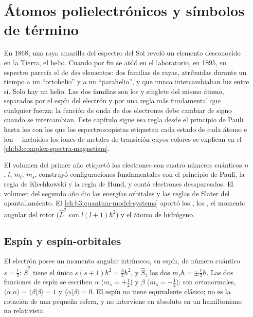 \chapter{Átomos polielectrónicos y símbolos de término}\label{ch:b3:many-electron-atoms}

En 1868, una raya amarilla del espectro del Sol reveló un elemento
desconocido en la Tierra, el helio. Cuando por fin se aisló en el laboratorio, en
1895, su espectro parecía el de \emph{dos} elementos: dos familias de
rayas, atribuidas durante un tiempo a un ``ortohelio'' y a un
``parahelio'', y que nunca intercambiaban luz entre sí. Solo hay
un helio. Las dos familias son los  y singlete del
mismo átomo, separados por el espín del electrón y por una regla más fundamental
que cualquier fuerza: la función de onda de dos electrones debe cambiar de signo cuando
se intercambian. Este capítulo sigue esa regla desde el principio de Pauli hasta
los  con los que los espectroscopistas etiquetan cada estado de cada átomo
e ion ---incluidos los iones de metales de transición cuyos colores se explican
en el \cref{ch:b3:complex-spectra-magnetism}.

\begin{recall}
El volumen del primer año etiquetó los electrones con cuatro números cuánticos $n$, $l$,
$m_l$, $m_s$, construyó configuraciones fundamentales con el principio de Pauli, la
regla de Klechkowski y la regla de Hund, y contó electrones desapareados. El volumen del segundo
año dio las energías orbitales y las reglas de Slater del apantallamiento.
El \cref{ch:b3:quantum-model-systems} aportó los , los , el
momento angular del rotor ($\hat L^2$ con  $l(l+1)\hbar^2$) y el
átomo de hidrógeno.
\end{recall}

\section{Espín y espín-orbitales}

El electrón posee un momento angular intrínseco, su espín, de número
cuántico $s = \frac12$: $\hat S^2$ tiene el único  $s(s+1)\hbar^2 =
\frac34\hbar^2$, y $\hat S_z$ los dos  $m_s\hbar = \pm\frac12\hbar$.
Las dos funciones de espín se escriben $\alpha$ ($m_s = +\frac12$) y $\beta$
($m_s = -\frac12$); son ortonormales, $\langle\alpha|\alpha\rangle =
\langle\beta|\beta\rangle = 1$ y $\langle\alpha|\beta\rangle = 0$. El espín no tiene
equivalente clásico; no es la rotación de una pequeña esfera, y no
interviene en absoluto en un hamiltoniano no relativista.

